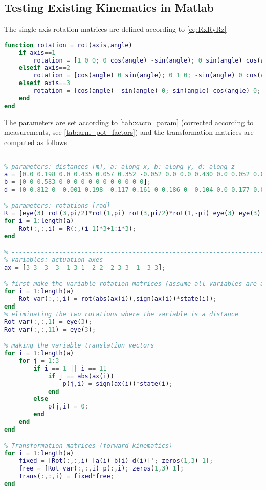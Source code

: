 \newpage

\subsection{Testing Existing Kinematics in Matlab}
The single-axis rotation matrices are defined according to \autoref{eq:RxRyRz}

\begin{lstlisting}[language=matlab]
function rotation = rot(axis,angle)
	if axis==1
		rotation = [1 0 0; 0 cos(angle) -sin(angle); 0 sin(angle) cos(angle)];
	elseif axis==2
		rotation = [cos(angle) 0 sin(angle); 0 1 0; -sin(angle) 0 cos(angle)];
	elseif axis==3
		rotation = [cos(angle) -sin(angle) 0; sin(angle) cos(angle) 0; 0 0 1];
	end
end
\end{lstlisting}

The parameters are set according to \autoref{tab:xacro_param} (corrected according to measurements, see \autoref{tab:arm_pot_factors}) and the transformation matrices are computed as follows

\begin{lstlisting}[language=matlab]
%% Existing reference frames according to xacro files

% parameters: distances [m], a: along x, b: along y, d: along z
a = [0.0 0.198 0.0 0.435 0.057 0.352 -0.052 0.0 0.0 0.430 0.0 0.052 0.0 0.0 0.0];
b = [0 0 0.583 0 0 0 0 0 0 0 0 0 0 0 0];
d = [0 0.812 0 -0.001 0.198 -0.117 0.161 0 0.186 0 -0.104 0.0 0.177 0.009 0.009];

% parameters: rotations [rad]
R = [eye(3) rot(3,pi/2)*rot(1,pi) rot(3,pi/2)*rot(1,-pi) eye(3) eye(3) eye(3) eye(3) rot(2,-0.1745) rot(2,0.1745)*rot(1,pi) rot(1,pi) eye(3) rot(3,pi/2)*rot(1,pi) eye(3) rot(2,pi/2)*rot(1,pi/2) rot(2,pi/2)*rot(1,pi/2)];
for i = 1:length(a)
	Rot(:,:,i) = R(:,(i-1)*3+1:i*3);
end

% -----------------------------------------------------------------------
% variables: actuation axes
ax = [3 3 -3 -3 -1 3 1 -2 2 -2 3 3 -1 -3 3];

% first make the variable rotation matrices (assume all variables are angles)
for i = 1:length(a)
	Rot_var(:,:,i) = rot(abs(ax(i)),sign(ax(i))*state(i));
end
% eliminating the two rotations where the variable is a distance
Rot_var(:,:,1) = eye(3);
Rot_var(:,:,11) = eye(3);

% making the variable translation vectors
for i = 1:length(a)
	for j = 1:3
		if i == 1 || i == 11
			if j == abs(ax(i)) 
				p(j,i) = sign(ax(i))*state(i);
			end
		else
			p(j,i) = 0;
		end
	end
end

% Transformation matrices (forward kinematics)
for i = 1:length(a)
	fixed = [Rot(:,:,i) [a(i) b(i) d(i)]'; zeros(1,3) 1];
	free = [Rot_var(:,:,i) p(:,i); zeros(1,3) 1];
	Trans(:,:,i) = fixed*free;
end
\end{lstlisting}

